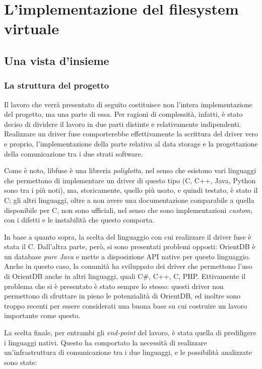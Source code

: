 \chapter{L'implementazione del filesystem virtuale}

\section{Una vista d'insieme}
\subsection{La struttura del progetto}
Il lavoro che verrà presentato di seguito costituisce non l'intera implementazione del progetto, ma una parte di essa. Per ragioni di complessità, infatti, è stato deciso di dividere il lavoro in due parti distinte e relativamente indipendenti.
Realizzare un driver fuse comporterebbe effettivamente la scrittura del driver vero e proprio, l'implementazione della parte relativa al data storage e la progettazione della comunicazione tra i due strati software.

Come è noto, libfuse è una libreria \emph{poliglotta}, nel senso che esistono vari linguaggi che permettono di implementare un driver di questo tipo (C, C++, Java, Python sono tra i più noti), ma, storicamente, quello più usato, e quindi testato, è stato il C; gli altri linguaggi, oltre a non avere una documentazione comparabile a quella disponibile per C, non sono ufficiali, nel senso che sono implementazioni \emph{custom}, con i difetti e le instabilità che questo comporta.

In base a quanto sopra, la scelta del linguaggio con cui realizzare il driver fuse è stata il C. Dall'altra parte, però, si sono presentati problemi opposti: OrientDB è un database \emph{pure Java} e mette a disposizione API native per questo linguaggio. Anche in questo caso, la comunità ha sviluppato dei driver che permettono l'uso di OrientDB anche in altri linguaggi, quali C\#, C++, C, PHP. Ettivamente il problema che si è presentato è stato sempre lo stesso: questi driver non permettono di sfruttare in pieno le potenzialità di OrientDB, ed inoltre sono troppo recenti per essere considerati una buona base su cui costruire un lavoro importante come questo.

La scelta finale, per entrambi gli \emph{end-point} del lavoro, è stata quella di prediligere i linguaggi nativi. Questo ha comportato la necessità di realizzare un'infrastruttura di comunicazione tra i due linguaggi, e le possibilità analizzate sono state:

